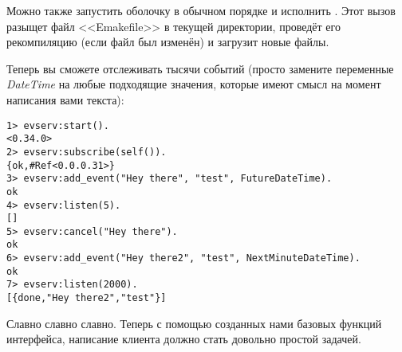 Можно также запустить оболочку в обычном порядке и исполнить .
Этот вызов разыщет файл <<Emakefile>> в текущей директории, проведёт его рекомпиляцию (если файл был изменён) и загрузит новые файлы.

Теперь вы сможете отслеживать тысячи событий (просто замените переменные \emph{DateTime} на любые подходящие значения, которые имеют смысл на момент написания вами текста): 
\begin{lstlisting}[style=erlang]
1> evserv:start().
<0.34.0>
2> evserv:subscribe(self()).
{ok,#Ref<0.0.0.31>}
3> evserv:add_event("Hey there", "test", FutureDateTime).
ok
4> evserv:listen(5).
[]
5> evserv:cancel("Hey there").
ok
6> evserv:add_event("Hey there2", "test", NextMinuteDateTime).
ok
7> evserv:listen(2000).
[{done,"Hey there2","test"}]
\end{lstlisting}

Славно славно славно.
Теперь с помощью созданных нами базовых функций интерфейса, написание клиента должно стать довольно простой задачей.

